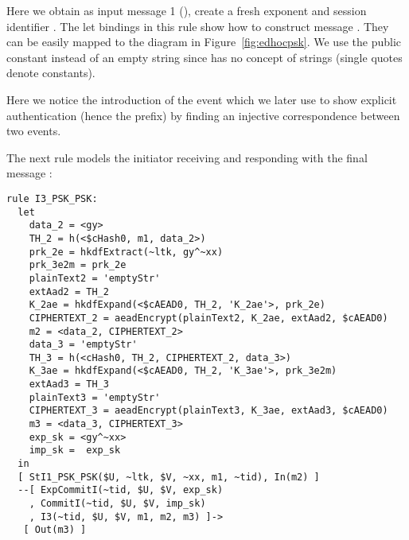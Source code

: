 Here we obtain as input message 1 (), create a fresh exponent  and
session identifier .  The let bindings in this rule show how to
construct message .  They can be easily mapped to the diagram in
Figure~\ref{fig:edhocpsk}.  We use the public constant  instead
of an empty string since \mTamarin{} has no concept of strings (single quotes
denote constants).

Here we notice the introduction of the event 
% 
which we  later use to show explicit authentication (hence the  prefix) by
finding an injective correspondence between two events.

The next rule models the initiator receiving  and responding with the
final message :
\begin{lstlisting}
rule I3_PSK_PSK:
  let
    data_2 = <gy> 
    TH_2 = h(<$cHash0, m1, data_2>)
    prk_2e = hkdfExtract(~ltk, gy^~xx)
    prk_3e2m = prk_2e
    plainText2 = 'emptyStr' 
    extAad2 = TH_2
    K_2ae = hkdfExpand(<$cAEAD0, TH_2, 'K_2ae'>, prk_2e)
    CIPHERTEXT_2 = aeadEncrypt(plainText2, K_2ae, extAad2, $cAEAD0)
    m2 = <data_2, CIPHERTEXT_2>
    data_3 = 'emptyStr' 
    TH_3 = h(<cHash0, TH_2, CIPHERTEXT_2, data_3>)
    K_3ae = hkdfExpand(<$cAEAD0, TH_2, 'K_3ae'>, prk_3e2m)
    extAad3 = TH_3
    plainText3 = 'emptyStr'
    CIPHERTEXT_3 = aeadEncrypt(plainText3, K_3ae, extAad3, $cAEAD0)
    m3 = <data_3, CIPHERTEXT_3>
    exp_sk = <gy^~xx>
    imp_sk =  exp_sk
  in
  [ StI1_PSK_PSK($U, ~ltk, $V, ~xx, m1, ~tid), In(m2) ]
  --[ ExpCommitI(~tid, $U, $V, exp_sk)
    , CommitI(~tid, $U, $V, imp_sk)
    , I3(~tid, $U, $V, m1, m2, m3) ]->
   [ Out(m3) ]
\end{lstlisting}


